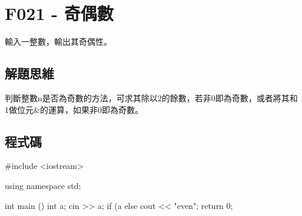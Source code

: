 \section{F021 - 奇偶數}
輸入一整數，輸出其奇偶性。

\subsection{解題思維}
判斷整數n是否為奇數的方法，可求其除以2的餘數，若非0即為奇數，或者將其和1做位元\&的運算，如果非0即為奇數。
\begin{inside}
	if (n%
	if (n&1) { // n 為奇數
\end{inside}
\subsection{程式碼}
\begin{cppcode}
	#include <iostream>
	
	using namespace std;
	
	int main ()
	{
		int a;
		cin >> a;
		if (a%
		else cout << "even";
		return 0;
	}
\end{cppcode}
